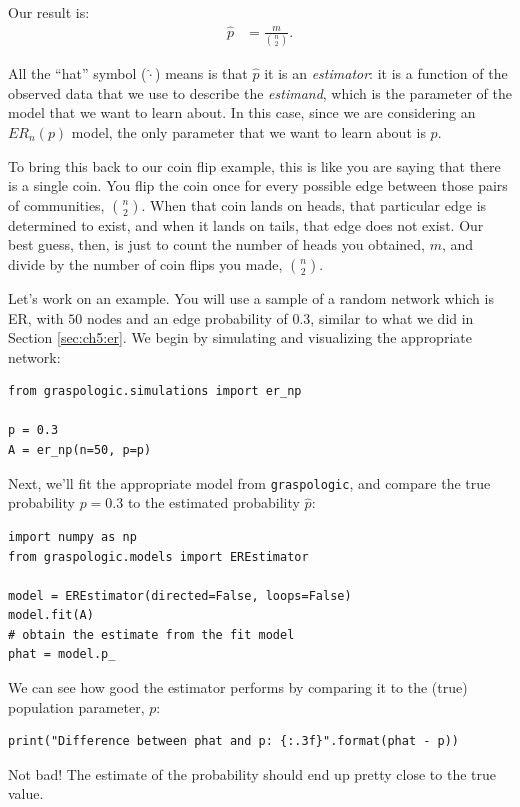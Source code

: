Our result is:
\begin{align*}
    \hat p &= \frac{m}{\binom n 2}.
\end{align*}

All the ``hat'' symbol ($\hat \cdot $) means is that $\hat p$ it is an \textit{estimator}: it is a function of the observed data that we use to describe the \textit{estimand}, which is the parameter of the model that we want to learn about. In this case, since we are considering an $ER_n(p)$ model, the only parameter that we want to learn about is $p$.

To bring this back to our coin flip example, this is like you are saying that there is a single coin. You flip the coin once for every possible edge between those pairs of communities, $\binom n 2$. When that coin lands on heads, that particular edge is determined to exist, and when it lands on tails, that edge does not exist. Our best guess, then, is just to count the number of heads you obtained, $m$, and divide by the number of coin flips you made, $\binom n 2$. 

Let's work on an example. You will use a sample of a random network which is ER, with $50$ nodes and an edge probability of $0.3$, similar to what we did in Section \ref{sec:ch5:er}. We begin by simulating and visualizing the appropriate network: 


\begin{lstlisting}[style=python]
from graspologic.simulations import er_np

p = 0.3
A = er_np(n=50, p=p)
\end{lstlisting}

Next, we'll fit the appropriate model from \texttt{graspologic}, and compare the true probability $p=0.3$ to the estimated probability $\hat p$:
\begin{lstlisting}[style=python]
import numpy as np
from graspologic.models import EREstimator

model = EREstimator(directed=False, loops=False)
model.fit(A)
# obtain the estimate from the fit model
phat = model.p_
\end{lstlisting}

We can see how good the estimator performs by comparing it to the (true) population parameter, $p$:

\begin{lstlisting}[style=python]
print("Difference between phat and p: {:.3f}".format(phat - p))
\end{lstlisting}

Not bad! The estimate of the probability should end up pretty close to the true value. 

